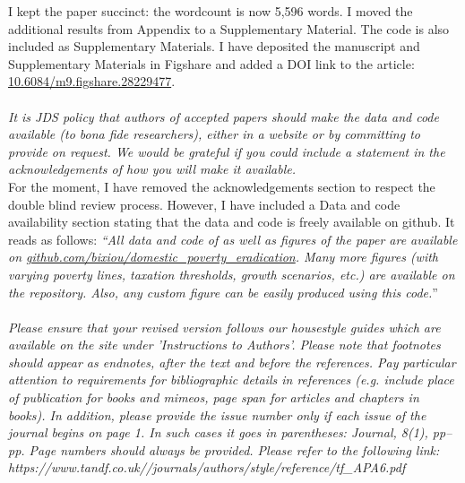 \documentclass[12pt,english]{article}
\begin{document}
I kept the paper succinct: the wordcount is now 5,596 words. I moved the additional results from Appendix to a Supplementary Material. The code is also included as Supplementary Materials. I have deposited the manuscript and Supplementary Materials in Figshare and added a DOI link to the article: \href{https://figshare.com/articles/dataset/dx_doi_org_10_6084_m9_figshare_6025748/6025748}{10.6084/m9.figshare.28229477}.  
~\\ ~\\

\textit{It is JDS policy that authors of accepted papers should make the data and code available (to bona fide researchers), either in a website or by committing to provide on request.  We would be grateful if you could include a statement in the acknowledgements of how you will make it available.}~\\

For the moment, I have removed the acknowledgements section to respect the double blind review process. However, I have included a Data and code availability section stating that the data and code is freely available on github. It reads as follows: \textit{``All data and code of as well as figures of the paper are available on \href{https://github.com/bixiou/domestic_poverty_eradication}{github.com/bixiou/domestic\_poverty\_eradication}. Many more figures (with varying poverty lines, taxation thresholds, growth scenarios, etc.) are available on the repository. %
Also, any custom figure can be easily produced using this code.}''
~\\ ~\\

\textit{Please ensure that your revised version follows our housestyle guides which are available on the site under 'Instructions to Authors'.  Please note that footnotes should appear as endnotes, after the text and before the references.   Pay particular attention to requirements for bibliographic details in references (e.g. include place of publication for books and mimeos, page span for articles and chapters in books).  In addition, please provide the issue number only if each issue of the journal begins on page 1.  In such cases it goes in parentheses:  Journal, 8(1), pp–pp.  Page numbers should always be provided.  Please refer to the following link:   https://www.tandf.co.uk//journals/authors/style/reference/tf\_APA6.pdf}~\\
\end{document}
